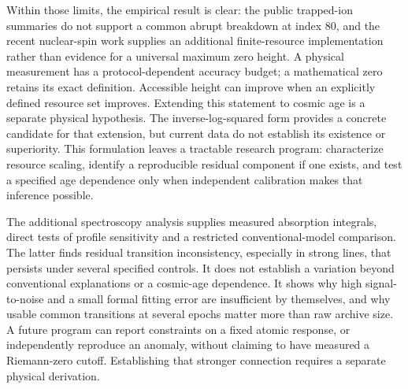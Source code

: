 \documentclass[aps,pra,onecolumn,amsmath,amssymb,nofootinbib,superscriptaddress,floatfix,11pt]{revtex4-2}
\begin{document}
Within those limits, the empirical result is clear: the public trapped-ion summaries do not support a common abrupt breakdown at index 80, and the recent nuclear-spin work supplies an additional finite-resource implementation rather than evidence for a universal maximum zero height. A physical measurement has a protocol-dependent accuracy budget; a mathematical zero retains its exact definition. Accessible height can improve when an explicitly defined resource set improves. Extending this statement to cosmic age is a separate physical hypothesis. The inverse-log-squared form provides a concrete candidate for that extension, but current data do not establish its existence or superiority. This formulation leaves a tractable research program: characterize resource scaling, identify a reproducible residual component if one exists, and test a specified age dependence only when independent calibration makes that inference possible.

The additional spectroscopy analysis supplies measured absorption integrals, direct tests of profile sensitivity and a restricted conventional-model comparison. The latter finds residual transition inconsistency, especially in strong lines, that persists under several specified controls. It does not establish a variation beyond conventional explanations or a cosmic-age dependence. It shows why high signal-to-noise and a small formal fitting error are insufficient by themselves, and why usable common transitions at several epochs matter more than raw archive size. A future program can report constraints on a fixed atomic response, or independently reproduce an anomaly, without claiming to have measured a Riemann-zero cutoff. Establishing that stronger connection requires a separate physical derivation.
\end{document}
